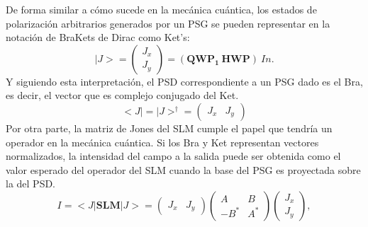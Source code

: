 De forma similar a cómo sucede en la mecánica cuántica, los estados de
polarización arbitrarios generados por un PSG se pueden representar en
la notación de BraKets de Dirac como Ket's:
\begin{equation}
|J> = \begin{pmatrix} J_x \\ J_y\end{pmatrix} = \left( \mathbf{QWP_1}\
\mathbf{HWP}\right)\ In.
\end{equation}
Y siguiendo esta interpretación, el PSD correspondiente a un PSG dado
es el Bra, es decir, el vector que es complejo conjugado del Ket.
\begin{equation}
<J|= |J>^{\dagger} = \begin{pmatrix} J_x &  J_y\end{pmatrix} 
\end{equation}
Por otra parte, la matriz de Jones del SLM cumple el papel que tendría un
operador en la mecánica cuántica. Si los Bra y Ket representan vectores normalizados, la
intensidad del campo a la salida puede ser obtenida como el valor
esperado del operador del SLM cuando la base del PSG es proyectada
sobre la del PSD.
\begin{equation}
\label{eq:valor_esperado}
I = <J|\mathbf{SLM} |J> = 
\begin{pmatrix}
J_x & J_y
\end{pmatrix}
\begin{pmatrix}
A & B\\
 -B^* & A^* 
\end{pmatrix}
\begin{pmatrix}
J_x \\ J_y
\end{pmatrix}
,
\end{equation}

